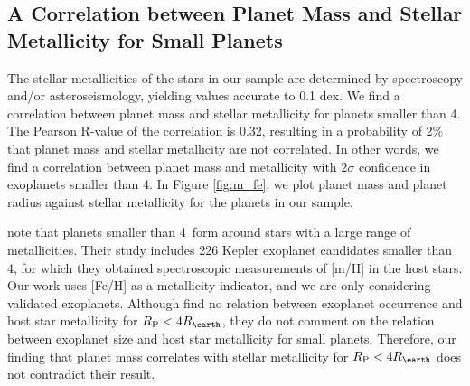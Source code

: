 \documentclass[11pt]{aastex}
\newcommand{\rspecial}{4 \rearth}
\begin{document}

\subsection{A Correlation between Planet Mass and Stellar Metallicity for Small Planets}
The stellar metallicities of the stars in our sample are determined by spectroscopy and/or asteroseismology, yielding values accurate to 0.1 dex.  We find a correlation between planet mass and stellar metallicity for planets smaller than 4\rearth.  The Pearson R-value of the correlation is 0.32, resulting in a probability of 2\% that planet mass and stellar metallicity are not correlated.  In other words, we find a correlation between planet mass and metallicity with $2\sigma$ confidence in exoplanets smaller than 4\rearth.  In Figure \ref{fig:m_fe}, we plot planet mass and planet radius against stellar metallicity for the planets in our sample.

\citet{Buchhave2012} note that planets smaller than 4\rearth\ form around stars with a large range of metallicities.  Their study includes 226 Kepler exoplanet candidates smaller than 4\rearth, for which they obtained spectroscopic measurements of [m/H] in the host stars.  Our work uses [Fe/H] as a metallicity indicator, and we are only considering validated exoplanets.  Although \citet{Buchhave2012} find no relation between exoplanet occurrence and host star metallicity for $\rpl < 4\rearth$, they do not comment on the relation between exoplanet size and host star metallicity for small planets.  Therefore, our finding that planet mass correlates with stellar metallicity for $\rpl < 4\rearth$ does not contradict their result.
\end{document}

